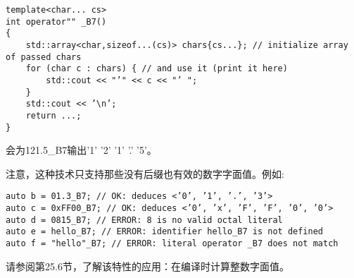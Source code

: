 \begin{lstlisting}[style=styleCXX]
template<char... cs>
int operator"" _B7()
{
	std::array<char,sizeof...(cs)> chars{cs...}; // initialize array of passed chars
	for (char c : chars) { // and use it (print it here)
		std::cout << "’" << c << "’ ";
	}
	std::cout << ’\n’;
	return ...;
}
\end{lstlisting}

会为121.5\_B7输出'1' '2' '1' '.' '5'。

注意，这种技术只支持那些没有后缀也有效的数字字面值。例如:

\begin{lstlisting}[style=styleCXX]
auto b = 01.3_B7; // OK: deduces <’0’, ’1’, ’.’, ’3’>
auto c = 0xFF00_B7; // OK: deduces <’0’, ’x’, ’F’, ’F’, ’0’, ’0’>
auto d = 0815_B7; // ERROR: 8 is no valid octal literal
auto e = hello_B7; // ERROR: identifier hello_B7 is not defined
auto f = "hello"_B7; // ERROR: literal operator _B7 does not match
\end{lstlisting}

请参阅第25.6节，了解该特性的应用：在编译时计算整数字面值。






















